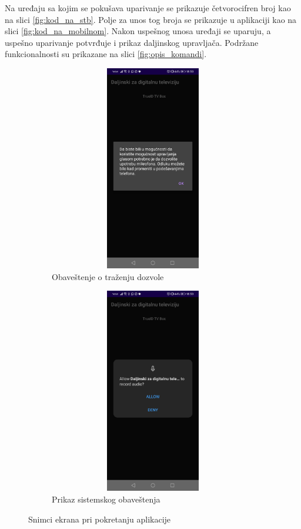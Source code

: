 \documentclass[implementacija.tex]{subfiles}
\begin{document}
Na uređaju sa kojim se pokušava uparivanje se prikazuje četvorocifren broj kao na slici \ref{fig:kod_na_stb}. Polje za unos tog broja se prikazuje u aplikaciji kao na slici \ref{fig:kod_na_mobilnom}. Nakon uspešnog unosa uređaji se uparuju, a uspešno uparivanje potvrđuje i prikaz daljinskog upravljača. Podržane funkcionalnosti su prikazane na slici \ref{fig:opis_komandi}.

\begin{figure}
    \centering
    \begin{subfigure}[b]{0.4\textwidth}
        \centering
        \includegraphics[width=10cm, height=9cm,keepaspectratio]{Implementacija/snimci_ekrana/1_obavestenje_za_dozvolu.jpg}
        \caption{Obaveštenje o traženju dozvole}
        \label{fig:dozvola}
    \end{subfigure}
    \hfill
    \begin{subfigure}[b]{0.4\textwidth}
        \centering
        \includegraphics[width=10cm, height=9cm, keepaspectratio]{Implementacija/snimci_ekrana/2_sistemska_dozvola.jpg}
        \caption{Prikaz sistemskog obaveštenja}
        \label{fig:sistemsko_obavestenje}
    \end{subfigure}
    \caption{Snimci ekrana pri pokretanju aplikacije}
    \label{fig:obavestenja}
\end{figure}
\end{document}
